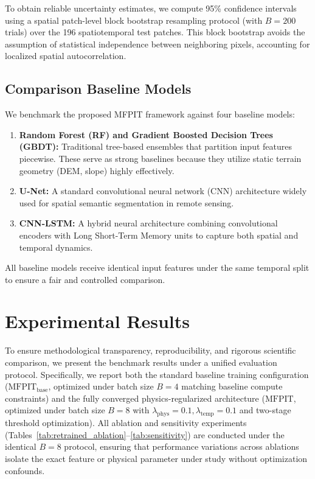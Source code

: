 \documentclass[preprint,12pt]{elsarticle}
\begin{document}
To obtain reliable uncertainty estimates, we compute 95\% confidence intervals using a spatial patch-level block bootstrap resampling protocol (with $B=200$ trials) over the 196 spatiotemporal test patches. This block bootstrap avoids the assumption of statistical independence between neighboring pixels, accounting for localized spatial autocorrelation.

\subsection{Comparison Baseline Models}
We benchmark the proposed MFPIT framework against four baseline models:
\begin{enumerate}
    \item \textbf{Random Forest (RF) and Gradient Boosted Decision Trees (GBDT):} Traditional tree-based ensembles that partition input features piecewise. These serve as strong baselines because they utilize static terrain geometry (DEM, slope) highly effectively.
    \item \textbf{U-Net:} A standard convolutional neural network (CNN) architecture widely used for spatial semantic segmentation in remote sensing.
    \item \textbf{CNN-LSTM:} A hybrid neural architecture combining convolutional encoders with Long Short-Term Memory units to capture both spatial and temporal dynamics.
\end{enumerate}
All baseline models receive identical input features under the same temporal split to ensure a fair and controlled comparison.

\section{Experimental Results}
To ensure methodological transparency, reproducibility, and rigorous scientific comparison, we present the benchmark results under a unified evaluation protocol. Specifically, we report both the standard baseline training configuration ($\text{MFPIT}_{\text{base}}$, optimized under batch size $B=4$ matching baseline compute constraints) and the fully converged physics-regularized architecture ($\text{MFPIT}$, optimized under batch size $B=8$ with $\lambda_{\text{phys}} = 0.1, \lambda_{\text{temp}} = 0.1$ and two-stage threshold optimization). All ablation and sensitivity experiments (Tables~\ref{tab:retrained_ablation}--\ref{tab:sensitivity}) are conducted under the identical $B=8$ protocol, ensuring that performance variations across ablations isolate the exact feature or physical parameter under study without optimization confounds.
\end{document}
